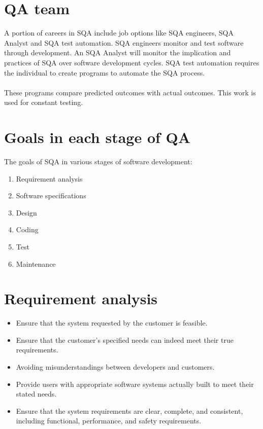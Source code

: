 \documentclass{article}
\begin{document}
\section{QA team}
A portion of careers in SQA include job options like SQA engineers, SQA Analyst and SQA test automation. SQA engineers monitor and test software through development. An SQA Analyst will monitor the implication and practices of SQA over software development cycles. SQA test automation requires the individual to create programs to automate the SQA process.\\~\\
These programs compare predicted outcomes with actual outcomes. This work is used for constant testing.
\section{Goals in each stage of QA}
The goals of SQA in various stages of software development:
\begin{enumerate}
\item Requirement analysis
\item Software specifications
\item Design
\item Coding
\item Test
\item Maintenance
\end{enumerate}
\newpage
\section{Requirement analysis}
\begin{itemize}
\item Ensure that the system requested by the customer is feasible.
\item Ensure that the customer's specified needs can indeed meet their true requirements.
\item Avoiding misunderstandings between developers and customers.
\item Provide users with appropriate software systems actually built to meet their stated needs.
\item Ensure that the system requirements are clear, complete, and consistent, including functional, performance, and safety requirements.
\end{itemize}
\end{document}
